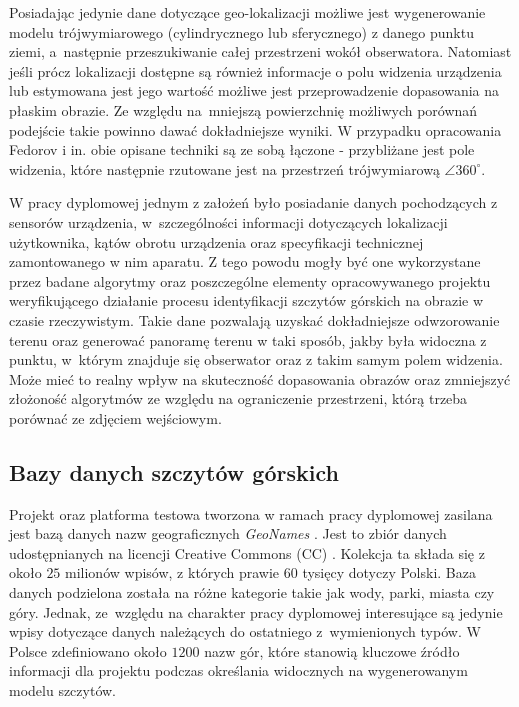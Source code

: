 \par

Posiadając jedynie dane dotyczące geo-lokalizacji możliwe jest wygenerowanie modelu trójwymiarowego (cylindrycznego lub sferycznego) \cite{auto-terrain}\cite{peak-social-media}\cite{large-scale-visual} z danego punktu ziemi, a~następnie przeszukiwanie całej przestrzeni wokół obserwatora. Natomiast jeśli prócz lokalizacji dostępne są również informacje o polu widzenia urządzenia lub estymowana jest jego wartość możliwe jest przeprowadzenie dopasowania na płaskim obrazie. Ze względu na~mniejszą powierzchnię możliwych porównań podejście takie powinno dawać dokładniejsze wyniki. W przypadku opracowania Fedorov i in. \cite{peak-in-visual-content} obie opisane techniki są ze sobą łączone - przybliżane jest pole widzenia, które następnie rzutowane jest na przestrzeń trójwymiarową $\angle 360^{\circ}$.

\par

W pracy dyplomowej jednym z założeń było posiadanie danych  pochodzących z sensorów urządzenia, w~szczególności informacji dotyczących lokalizacji użytkownika, kątów obrotu urządzenia oraz specyfikacji technicznej zamontowanego w nim aparatu. Z tego powodu mogły być one wykorzystane przez badane algorytmy oraz poszczególne elementy opracowywanego projektu weryfikującego działanie procesu identyfikacji szczytów górskich na obrazie w czasie rzeczywistym. Takie dane pozwalają uzyskać dokładniejsze odwzorowanie terenu oraz generować panoramę terenu w taki sposób, jakby była widoczna z punktu, w~którym znajduje się obserwator oraz z takim samym polem widzenia. Może mieć to realny wpływ na skuteczność dopasowania obrazów oraz zmniejszyć złożoność algorytmów ze względu na ograniczenie przestrzeni, którą trzeba porównać ze zdjęciem wejściowym. 

\subsection{Bazy danych szczytów górskich} \label{section:geonames}

Projekt oraz platforma testowa tworzona w ramach pracy dyplomowej zasilana jest bazą danych nazw geograficznych \textit{GeoNames} \cite{geonames}. Jest to zbiór danych udostępnianych na licencji Creative Commons (CC) \cite{cc}. Kolekcja ta składa się z około $25$ milionów wpisów, z których prawie $60$ tysięcy dotyczy Polski. Baza danych podzielona została na różne kategorie takie jak wody, parki, miasta czy góry. Jednak, ze~względu na charakter pracy dyplomowej interesujące są jedynie wpisy dotyczące danych należących do ostatniego z~wymienionych typów. W Polsce zdefiniowano około $1200$ nazw gór, które stanowią kluczowe źródło informacji dla projektu podczas określania widocznych na wygenerowanym modelu szczytów. 

